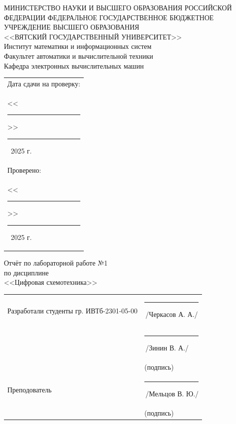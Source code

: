\documentclass[oneside,a4paper,14pt]{extarticle}
\begin{document}
\newpage
\thispagestyle{empty}
\begin{center}
  МИНИСТЕРСТВО НАУКИ И ВЫСШЕГО ОБРАЗОВАНИЯ РОССИЙСКОЙ ФЕДЕРАЦИИ ФЕДЕРАЛЬНОЕ ГОСУДАРСТВЕННОЕ БЮДЖЕТНОЕ УЧРЕЖДЕНИЕ ВЫСШЕГО ОБРАЗОВАНИЯ\\
  <<ВЯТСКИЙ ГОСУДАРСТВЕННЫЙ УНИВЕРСИТЕТ>>\\
  Институт математики и информационных систем\\
  Факультет автоматики и вычислительной техники\\
  Кафедра электронных вычислительных машин
\end{center}
\vspace{10mm}

\hfill
\begin{tabular}{l}
  \footnotesize Дата сдачи на проверку:                                          \\
  \footnotesize <<\rule[-1mm]{5mm}{0.10mm}\/>>\rule[-1mm]{20mm}{0.10mm}\ 2025 г. \\
  \footnotesize Проверено:                                                       \\
  \footnotesize <<\rule[-1mm]{5mm}{0.10mm}\/>>\rule[-1mm]{20mm}{0.10mm}\ 2025 г. \\
\end{tabular}
\vfill

\begin{center}
  Отчёт по лабораторной работе №1\\
  по дисциплине\\
  <<Цифровая схемотехника>>\\
\end{center}
\vspace{25mm}
\noindent
\begin{tabular}{ll}
  Разработали студенты гр. ИВТб-2301-05-00 & \hspace{5mm}\rule[-1mm]{30mm}{0.10mm}\,/Черкасов А. А./ \\
                                           & \hspace{5mm}\rule[-1mm]{30mm}{0.10mm}\,/Зинин В. А./    \\
                                           & \hspace{12.5mm}\footnotesize(подпись)                   \\
  Преподователь                            & \hspace{5mm}\rule[-1mm]{30mm}{0.10mm}\,/Мельцов В. Ю./  \\
                                           & \hspace{12.5mm}\footnotesize(подпись)                   \\
\end{tabular}
\end{document}
